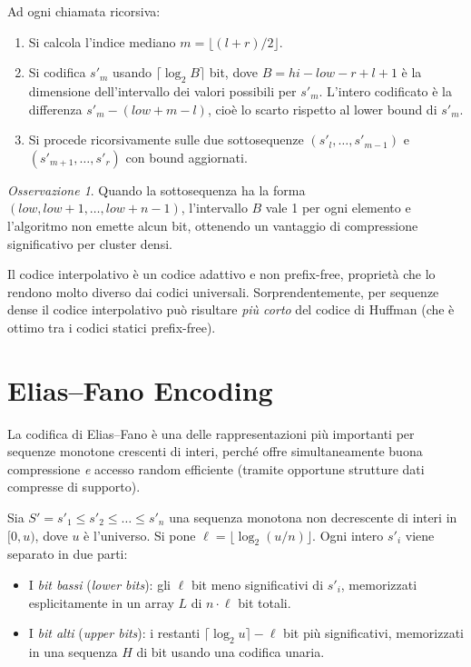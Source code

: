 \documentclass[12pt, a4paper, oneside]{book}
\theoremstyle{plain}
\theoremstyle{definition}
\theoremstyle{remark}
\newtheorem{osservazione}[teorema]{Osservazione}
\begin{document}
Ad ogni chiamata ricorsiva:
\begin{enumerate}
  \item Si calcola l'indice mediano $m = \lfloor (l+r)/2 \rfloor$.
  \item Si codifica $s'_m$ usando $\lceil \log_2 B \rceil$ bit, dove $B = \mathit{hi} - \mathit{low} - r + l + 1$ è la dimensione dell'intervallo dei valori possibili per $s'_m$. L'intero codificato è la differenza $s'_m - (\mathit{low} + m - l)$, cioè lo scarto rispetto al lower bound di $s'_m$.
  \item Si procede ricorsivamente sulle due sottosequenze $(s'_l, \ldots, s'_{m-1})$ e $(s'_{m+1}, \ldots, s'_r)$ con bound aggiornati.
\end{enumerate}

\begin{osservazione}
Quando la sottosequenza ha la forma $(\mathit{low}, \mathit{low}+1, \ldots, \mathit{low}+n-1)$, l'intervallo $B$ vale 1 per ogni elemento e l'algoritmo non emette alcun bit, ottenendo un vantaggio di compressione significativo per cluster densi.
\end{osservazione}

Il codice interpolativo è un codice adattivo e non prefix-free, proprietà che lo rendono molto diverso dai codici universali. Sorprendentemente, per sequenze dense il codice interpolativo può risultare \emph{più corto} del codice di Huffman (che è ottimo tra i codici statici prefix-free).

\section{Elias--Fano Encoding}
\label{sec:elias-fano}

La codifica di Elias--Fano è una delle rappresentazioni più importanti per sequenze monotone crescenti di interi, perché offre simultaneamente buona compressione \emph{e} accesso random efficiente (tramite opportune strutture dati compresse di supporto).

Sia $S' = s'_1 \leq s'_2 \leq \ldots \leq s'_n$ una sequenza monotona non decrescente di interi in $[0, u)$, dove $u$ è l'universo. Si pone $\ell = \lfloor \log_2(u/n) \rfloor$. Ogni intero $s'_i$ viene separato in due parti:
\begin{itemize}
  \item I \emph{bit bassi} (\emph{lower bits}): gli $\ell$ bit meno significativi di $s'_i$, memorizzati esplicitamente in un array $L$ di $n \cdot \ell$ bit totali.
  \item I \emph{bit alti} (\emph{upper bits}): i restanti $\lceil \log_2 u \rceil - \ell$ bit più significativi, memorizzati in una sequenza $H$ di bit usando una codifica unaria.
\end{itemize}
\end{document}
